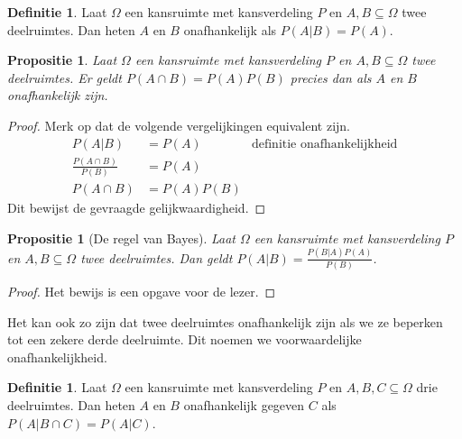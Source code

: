 \documentclass[a4paper]{book}
\newtheorem{proposition}[theorem]{Propositie}
\theoremstyle{definition}
\newtheorem{definition}[theorem]{Definitie}
\begin{document}
\begin{definition}
    Laat $\Omega$ een kansruimte met kansverdeling $P$ en $A,B \subseteq \Omega$ twee deelruimtes.
    Dan heten $A$ en $B$ onafhankelijk als $P(A|B) = P(A)$.
\end{definition}

\begin{proposition}
    Laat $\Omega$ een kansruimte met kansverdeling $P$ en $A,B \subseteq \Omega$ twee deelruimtes.
    Er geldt $P(A \cap B) = P(A)P(B)$ precies dan als $A$ en $B$ onafhankelijk zijn.
\end{proposition}
\begin{proof}
    Merk op dat de volgende vergelijkingen equivalent zijn.
    \begin{align*}
        P(A|B)                      &= P(A) & \text{definitie onafhankelijkheid}\\
        \frac{P(A \cap B)}{P(B)}    &= P(A) \\
        P(A \cap B)                 &= P(A)P(B)
    \end{align*}
    Dit bewijst de gevraagde gelijkwaardigheid.
\end{proof}

\begin{proposition}[De regel van Bayes]\label{bayes}
    Laat $\Omega$ een kansruimte met kansverdeling $P$ en $A,B \subseteq \Omega$ twee deelruimtes.
    Dan geldt $P(A|B) = \frac{P(B|A)P(A)}{P(B)}$.
\end{proposition}
\begin{proof}
    Het bewijs is een opgave voor de lezer.
\end{proof}

Het kan ook zo zijn dat twee deelruimtes onafhankelijk zijn als we ze beperken tot een zekere derde deelruimte.
Dit noemen we voorwaardelijke onafhankelijkheid.
\begin{definition}
    Laat $\Omega$ een kansruimte met kansverdeling $P$ en $A,B,C \subseteq \Omega$ drie deelruimtes.
    Dan heten $A$ en $B$ onafhankelijk gegeven $C$ als $P(A|B \cap C) = P(A|C)$.
\end{definition}
\end{document}
